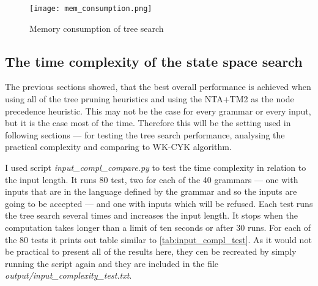 \begin{figure}[h]
  \texttt{[image: mem\_consumption.png]}
  \caption{Memory consumption of tree search}
  \label{fig:mem_consumption}
\end{figure}



\subsection{The time complexity of the state space search}
The previous sections showed, that the best overall performance is achieved when using all of the tree pruning heuristics and using the NTA+TM2 as the node precedence heuristic. This may not be the case for every grammar or every input, but it is the case most of the time. Therefore this will be the setting used in following sections --- for testing the tree search performance, analysing the practical complexity and comparing to WK-CYK algorithm.

I used script \textit{input\_compl\_compare.py} to test the time complexity in relation to the input length. It runs 80 test, two for each of the 40 grammars --- one with inputs that are in the language defined by the grammar and so the inputs are going to be accepted --- and one with inputs which will be refused. Each test runs the tree search several times and increases the input length. It stops when the computation takes longer than a limit of ten seconds or after 30 runs. For each of the 80 tests it prints out table similar to \ref{tab:input_compl_test}. As it would not be practical to present all of the results here, they cen be recreated by simply running the script again and they are included in the file \textit{output/input\_complexity\_test.txt}.

